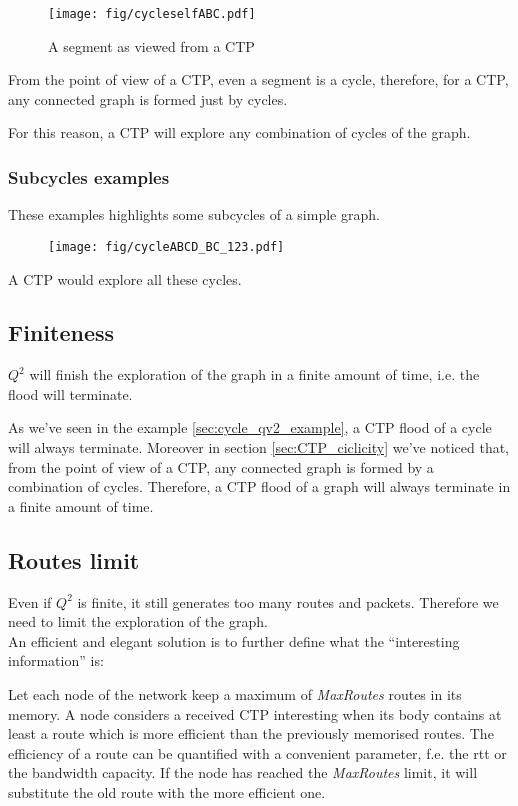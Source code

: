 \documentclass[a4paper]{article}
\begin{document}
\begin{figure}[h]
	\begin{center}
		\texttt{[image: fig/cycleselfABC.pdf]}
	\end{center}
	\caption{A segment as viewed from a CTP}
	\label{fig:CTP_segment}
\end{figure}

From the point of view of a CTP, even a segment is a cycle, therefore, for a
CTP, any connected graph is formed just by cycles.

For this reason, a CTP will explore any combination of cycles of the graph.

\subsubsection{Subcycles examples}
These examples highlights some subcycles of a simple graph.

\begin{figure}[h]
	\begin{center}
		\texttt{[image: fig/cycleABCD\_BC\_123.pdf]}
	\end{center}
\end{figure}
A CTP would explore all these cycles.

\subsection{Finiteness}
$Q^2$ will finish the exploration of the graph in a finite amount of time,
i.e. the flood will terminate.

As we've seen in the example \ref{sec:cycle_qv2_example}, a CTP flood of a
cycle will always terminate. Moreover in section \ref{sec:CTP_ciclicity} we've
noticed that, from the point of view of a CTP, any connected graph is formed
by a combination of cycles. Therefore, a CTP flood of a graph will always
terminate in a finite amount of time.

\subsection{Routes limit}
\label{sec:routes_limit}

Even if $Q^2$ is finite, it still generates too many routes and packets.
Therefore we need to limit the exploration of the graph.\\
An efficient and elegant solution is to further define what the ``interesting
information'' is:

Let each node of the network keep a maximum of \emph{MaxRoutes} routes in
its memory. A node considers a received CTP interesting when its body contains
at least a route which is more efficient than the previously memorised routes.
The efficiency of a route can be quantified with a convenient parameter, f.e.
the rtt or the bandwidth capacity.
If the node has reached the \emph{MaxRoutes} limit, it will substitute the old
route with the more efficient one.
\end{document}
